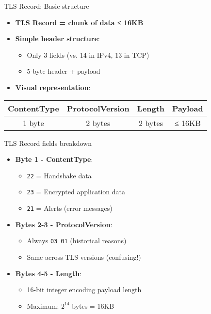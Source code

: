 \documentclass[aspectratio=169, lualatex, handout]{beamer}
\begin{document}
\begin{frame}{TLS Record: Basic structure}
	\begin{itemize}
		\item \textbf{TLS Record = chunk of data ≤ 16KB}
		\item \textbf{Simple header structure}:
		      \begin{itemize}
			      \item Only 3 fields (vs. 14 in IPv4, 13 in TCP)
			      \item 5-byte header + payload
		      \end{itemize}
		\item \textbf{Visual representation}:
	\end{itemize}
	\pause
	\begin{center}
		\begin{tabular}{|c|c|c|c|}
			\hline
			\textbf{ContentType} & \textbf{ProtocolVersion} & \textbf{Length} & \textbf{Payload} \\
			\hline
			1 byte               & 2 bytes                  & 2 bytes         & ≤ 16KB           \\
			\hline
		\end{tabular}
	\end{center}
\end{frame}

\begin{frame}{TLS Record fields breakdown}
	\begin{itemize}
		\item \textbf{Byte 1 - ContentType}:
		      \begin{itemize}
			      \item \texttt{22} = Handshake data
			      \item \texttt{23} = Encrypted application data
			      \item \texttt{21} = Alerts (error messages)
		      \end{itemize}
		\item \textbf{Bytes 2-3 - ProtocolVersion}:
		      \begin{itemize}
			      \item Always \texttt{03 01} (historical reasons)
			      \item Same across TLS versions (confusing!)
		      \end{itemize}
		\item \textbf{Bytes 4-5 - Length}:
		      \begin{itemize}
			      \item 16-bit integer encoding payload length
			      \item Maximum: $2^{14}$ bytes = 16KB
		      \end{itemize}
	\end{itemize}
\end{frame}
\end{document}
